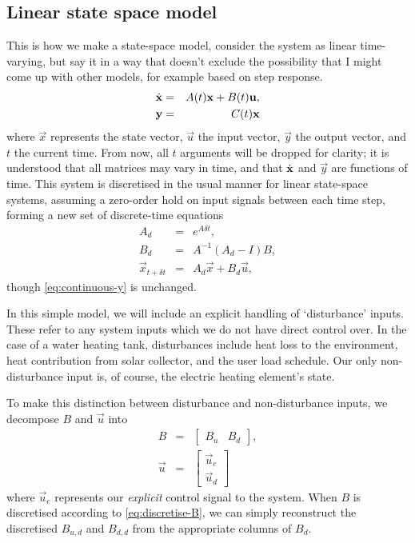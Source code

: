 \subsection{Linear state space model}

This is how we make a state-space model, consider the system as linear time-varying, but say it in a way that doesn't exclude the possibility that I might come up with other models, for example based on step response.
\begin{eqnarray}
   \label{eq:continuous-xdot}
   \dot{\mathbf{x}} &=& A(t) \mathbf{x} + B(t) \mathbf{u}, \\
   \label{eq:continuous-y}
   \mathbf{y} &=& C(t) \mathbf{x}
\end{eqnarray}
where $\vec{x}$ represents the state vector, $\vec{u}$ the input vector, $\vec{y}$ the output vector, and $t$ the current time.
From now, all $t$ arguments will be dropped for clarity; it is understood that all matrices may vary in time, and that $\dot{\mathbf{x}}$ and $\vec{y}$ are functions of time.
This system is discretised in the usual manner for linear state-space systems, assuming a zero-order hold on input signals between each time step, forming a new set of discrete-time equations
\begin{eqnarray}
   \label{eq:discretise-A}
   A_d &=& e^{A \delta t}, \\
   \label{eq:discretise-B}
   B_d &=& A^{-1} (A_d - I) B, \\
   \label{eq:discrete-xdot}
   \vec{x}_{t + \delta t} &=& A_d \vec{x} + B_d \vec{u},
\end{eqnarray}
though \autoref{eq:continuous-y} is unchanged.

In this simple model, we will include an explicit handling of `disturbance' inputs.
These refer to any system inputs which we do not have direct control over.
In the case of a water heating tank, disturbances include heat loss to the environment, heat contribution from solar collector, and the user load schedule.
Our only non-disturbance input is, of course, the electric heating element's state.

To make this distinction between disturbance and non-disturbance inputs, we decompose $B$ and $\vec{u}$ into
\begin{eqnarray}
   B &=& \left[\begin{array}{cc}
      B_u & B_d
   \end{array}\right], \\
   \vec{u} &=& \left[\begin{array}{c}
      \vec{u}_e \\ \vec{u}_d
   \end{array}\right]
\end{eqnarray}
where $\vec{u}_e$ represents our \emph{explicit} control signal to the system.
When $B$ is discretised according to \autoref{eq:discretise-B}, we can simply reconstruct the discretised $B_{u, d}$ and $B_{d, d}$ from the appropriate columns of $B_d$.

